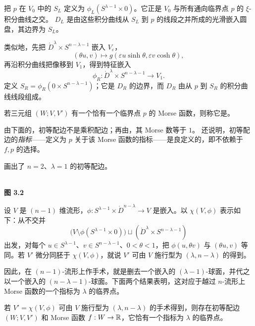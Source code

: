 把 $p$ 在 $V_0$ 中的\emph{} $S_L$ 定义为 $\phi_L(S^{\lambda-1}\times0)$。它正是 $V_0$ 与所有通向临界点 $p$ 的 $\xi$-积分曲线之交。\emph{} $D_L$ 是由这些积分曲线从 $S_L$ 到 $p$ 的线段之并所成的光滑嵌入圆盘，其边界为 $S_L$。

类似地，先把 $\mathring D^\lambda\times S^{n-\lambda-1}$ 嵌入 $V_\varepsilon$，
\[
  (\theta u,v)\longmapsto g(\varepsilon u\sinh\theta,\varepsilon v\cosh\theta),
\]
再沿积分曲线把像移到 $V_1$，得到特征嵌入
\[
  \phi_R:\mathring D^\lambda\times S^{n-\lambda-1}\longrightarrow V_1.
\]
定义 $S_R=\phi_R(0\times S^{n-\lambda-1})$；它是 $D_R$ 的边界，而 $D_R$ 由从 $p$ 到 $S_R$ 的积分曲线线段组成。

若三元组 $(W;V,V')$ 有一个恰有一个临界点 $p$ 的 Morse 函数，则称它是\emph{}。

\Remark 由下面的，初等配边不是乘积配边；再由，其 Morse 数等于 $1$。 还说明，初等配边的\emph{指标}——定义为 $p$ 关于该 Morse 函数的指标——是良定义的，即不依赖于 $f,p$ 的选择。

画出了 $n=2$、$\lambda=1$ 的初等配边。

\begin{center}
 \FigThreeTwo\\[-.4em]
  \label{fig:3.2}\textbf{图 3.2}
\end{center}

设 $V$ 是 $(n-1)$ 维流形，$\phi:S^{\lambda-1}\times\mathring D^{n-\lambda}\to V$ 是嵌入。以 $\chi(V,\phi)$ 表示如下：从不交并
\[
 \bigl(V\setminus\phi(S^{\lambda-1}\times0)\bigr)
 \sqcup(\mathring D^\lambda\times S^{n-\lambda-1})
\]
出发，对每个 $u\in S^{\lambda-1}$、$v\in S^{n-\lambda-1}$、$0<\theta<1$，把 $\phi(u,\theta v)$ 与 $(\theta u,v)$ 等同。若 $V'$ 微分同胚于 $\chi(V,\phi)$，就说 $V'$ 可由 $V$ 施行型为 $(\lambda,n-\lambda)$ 的\emph{}得到。

因此，在 $(n-1)$-流形上作手术，就是删去一个嵌入的 $(\lambda-1)$-球面，并代之以一个嵌入的 $(n-\lambda-1)$-球面。下面两个结果表明，这对应于越过 $n$-流形上 Morse 函数的一个指标为 $\lambda$ 的临界点。

若 $V'=\chi(V,\phi)$ 可由 $V$ 施行型为 $(\lambda,n-\lambda)$ 的手术得到，则存在初等配边 $(W;V,V')$ 和 Morse 函数 $f:W\to\mathbb{R}$，它恰有一个指标为 $\lambda$ 的临界点。

